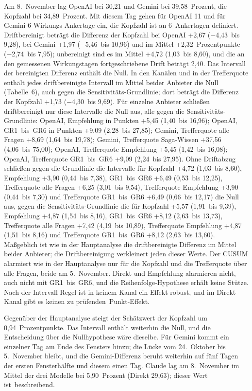 \documentclass[11pt]{article}
\begin{document}
Am 8.~November lag OpenAI bei 30,21 und Gemini bei 39,58~Prozent, die Kopfzahl bei 34,89~Prozent. Mit diesem Tag gehen für OpenAI 11 und für Gemini 6 Wirkungs-Ankertage ein, die Kopfzahl ist an 6~Ankertagen definiert. Driftbereinigt beträgt die Differenz der Kopfzahl bei OpenAI +2,67 (−4,43~bis 9,28), bei Gemini +1,97 (−5,46~bis 10,96) und im Mittel +2,32~Prozentpunkte (−2,74~bis 7,95); unbereinigt sind es im Mittel +4,72 (1,03~bis 8,60), und die an den gemessenen Wirkungstagen fortgeschriebene Drift beträgt 2,40. Das Intervall der bereinigten Differenz enthält die Null. In den Kanälen und in der Trefferquote enthält jedes driftbereinigte Intervall im Mittel beider Anbieter die Null (Tabelle~6), auch gegen die Sensitivitäts-Grundlinie; dort beträgt die Differenz der Kopfzahl +1,73 (−4,30~bis 9,69). Für einzelne Anbieter schließen driftbereinigt nur diese Intervalle die Null aus, alle gegen die Sensitivitäts-Grundlinie: OpenAI, Empfehlung in Punkten +5,45 (1,40~bis 16,96); OpenAI, GR1~bis~GR6 in Punkten +9,09 (2,28~bis 27,85); Gemini, Trefferquote alle Fragen +8,69 (1,64~bis 19,78); Gemini, Trefferquote Saga-Wissen +37,56 (4,06~bis 75,00); OpenAI, Trefferquote Empfehlung +5,45 (1,42~bis 16,08); OpenAI, Trefferquote GR1~bis~GR6 +9,09 (2,24~bis 27,95). Ohne Driftabzug schließen gegen die Grundlinie die Intervalle für Kopfzahl +4,72 (1,03~bis 8,60), Empfehlung +3,90 (0,44~bis 7,38), GR1~bis~GR6 +6,49 (0,53~bis 12,25), Trefferquote alle Fragen +6,25 (3,01~bis 9,54), Trefferquote Empfehlung +3,90 (0,44~bis 7,30) und Trefferquote GR1~bis~GR6 +6,49 (0,66~bis 12,17) die Null aus, gegen die Sensitivitäts-Grundlinie die für Kopfzahl +5,57 (1,91~bis 9,39), Empfehlung +4,87 (1,54~bis 8,16), GR1~bis~GR6 +8,12 (2,63~bis 13,73), Trefferquote alle Fragen +7,42 (4,19~bis 10,89), Trefferquote Empfehlung +4,87 (1,51~bis 8,16) und Trefferquote GR1~bis~GR6 +8,12 (2,63~bis 13,60). Maßgeblich ist wie in der Hauptanalyse die driftbereinigte Differenz im Mittel beider Anbieter; die Driftbereinigung verkleinert jeden dieser Werte. Der CUSUM alarmiert wie in der Hauptanalyse nur für die Kopfzahl und die Trefferquote über alle Fragen, beide am 5.~November. Direkt und Empfehlung alarmieren nicht, auch nicht mit GR1~bis~GR6, und die Reihenfolge-Hypothese erhält keine Stütze. Nach der Intervall-Regel ist in keinem Kanal ein Effekt robust, und im Direkt-Kanal gibt es keinen zu prüfenden~\mbox{Punkt-Effekt.}

Gegenüber der Hauptanalyse steigt der Schätzwert der Kopfzahl um 0,94~Prozentpunkte. Das Intervall enthält weiterhin die Null, und die Entscheidung über die Nullhypothese wäre dieselbe. Für Gemini kommt ein einzelner Tag am Ende des Fensters hinzu; die Lücke vom 24.~Oktober bis 5.~November bleibt, und die Gemini-Differenz beruht weiterhin auf fünf Tagen der ersten Fensterhälfte und diesem einen Tag. Claude lag am 8.~November im Mittel der drei Modelle bei 5,90~Prozent (Direkt 29,63); dieser Wert ist~\mbox{beschreibend.}
\end{document}
